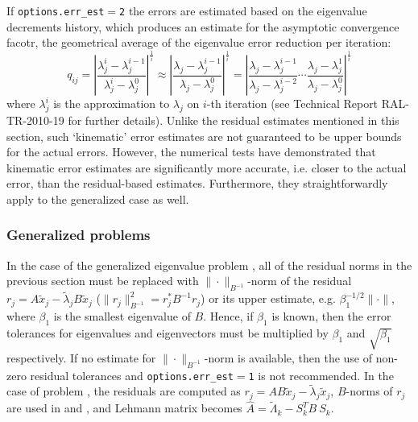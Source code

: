 If {\tt options.err\_est$=$2}
the errors are estimated
based on the eigenvalue decrements history,
which produces an estimate for 
the asymptotic convergence facotr,
the geometrical average of
the eigenvalue error reduction per iteration:
\begin{equation}
\label{ssmfe_core:eqn:acf}
q_{ij} =
\left|
\frac
{\lambda_j^i - \lambda_j^{i-1}}
{\lambda_j^i - \lambda_j^0}
\right|^{\frac{1}{i}}
\approx
\left|
\frac
{\lambda_j - \lambda_j^{i-1}}
{\lambda_j - \lambda_j^0}
\right|^{\frac{1}{i}}
=
\left|
\frac
{\lambda_j - \lambda_j^{i-1}}
{\lambda_j - \lambda_j^{i-2}}
\cdots
\frac
{\lambda_j - \lambda_j^1}
{\lambda_j - \lambda_j^0}
\right|^{\frac{1}{i}}
\end{equation}
%
where $\lambda_j^i$ is the approximation to $\lambda_j$ on
$i$-th iteration
(see Technical Report RAL-TR-2010-19 for further details).
Unlike the residual estimates mentioned in this section, 
such `kinematic' error estimates are
not guaranteed to be upper bounds for the actual errors.
However, the numerical tests have demonstrated
that kinematic error estimates 
are significantly more accurate,
i.e. closer to the actual error,
than the residual-based estimates. 
Furthermore, they straightforwardly
apply to the generalized case as well.

\subsubsection{Generalized problems}

In the case
of the generalized eigenvalue problem ,
all of the residual norms in the previous section must be replaced
with %
$\|\cdot\|_{B^{-1}}$-norm of the residual
$r_j = A \tilde x_j - \tilde\lambda_j B \tilde x_j$
($\|r_j\|_{B^{-1}}^2 = r_j^* B^{-1} r_j$)
or its upper estimate, e.g. 
$\beta_1^{-1/2}\|\cdot\|$,
where $\beta_1$ is the smallest eigenvalue of $B$.
Hence, if $\beta_1$ is known, then
the error tolerances for eigenvalues and eigenvectors
must be multiplied by $\beta_1$ and $\sqrt{\beta_1}$
respectively. If no estimate for $\|\cdot\|_{B^{-1}}$-norm
is available, then the use of
non-zero residual tolerances and
{\tt options.err\_est$=$1}
is not recommended.
In the case of problem ,
the residuals are computed as
$r_j = A B \tilde x_j - \tilde \lambda_j \tilde x_j$,
$B$-norms of $r_j$ are used in  and ,
and Lehmann matrix becomes
$\hat A = \tilde\Lambda_k - S_k^T B\ S_k$.

